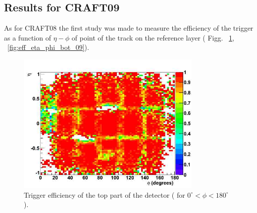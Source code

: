 \subsection{Results for CRAFT09}


As for CRAFT08 the first study was made to 
measure the efficiency of the trigger as a function of $\eta - \phi$
of point of the track on the  reference layer
( Figg. ~\ref{fig:eff_eta_phi_top_09}, ~\ref{fig:eff_eta_phi_bot_09}). 



\begin{figure}[hbtp]
\begin{minipage}{1.0\textwidth}
  \begin{center}
 
     \includegraphics[width=0.8\textwidth]{eff_eta_phi_top_09}
       \caption{ Trigger efficiency of the top part of the detector (
 for $ 0^\circ < \phi < 180^\circ $ ). 
}
    \label{fig:eff_eta_phi_top_09}
  \end{center}
  \end{minipage}


\end{figure}
